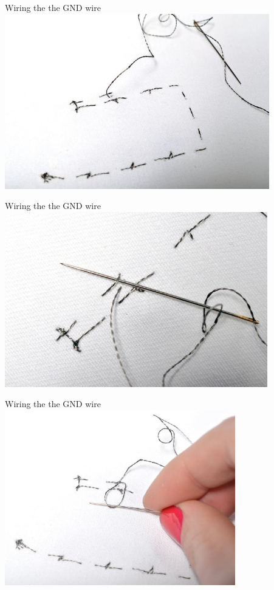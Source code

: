 \documentclass{beamer}
\begin{document}
\begin{frame}[fragile]{Wiring the the GND wire}
\includegraphics[height=3in]{flora_DSC_0118.jpg}
\end{frame}
\begin{frame}[fragile]{Wiring the the GND wire}
\includegraphics[height=3in]{flora_DSC_0119.jpg}
\end{frame}
\begin{frame}[fragile]{Wiring the the GND wire}
\includegraphics[height=3in]{flora_DSC_0120.jpg}
\end{frame}
\end{document}
